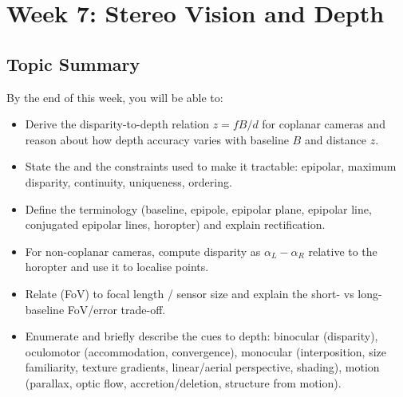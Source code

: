 \section{Week 7: Stereo Vision and Depth}

\subsection{Topic Summary}

\begin{keybox}
By the end of this week, you will be able to:
\begin{itemize}
  \item Derive the disparity-to-depth relation $z = fB/d$ for coplanar cameras and reason about how depth accuracy varies with baseline $B$ and distance $z$.
  \item State the  and the constraints used to make it tractable: epipolar, maximum disparity, continuity, uniqueness, ordering.
  \item Define the  terminology (baseline, epipole, epipolar plane, epipolar line, conjugated epipolar lines, horopter) and explain rectification.
  \item For non-coplanar cameras, compute disparity as $\alpha_L - \alpha_R$ relative to the horopter and use it to localise points.
  \item Relate  (FoV) to focal length / sensor size and explain the short- vs long-baseline FoV/error trade-off.
  \item Enumerate and briefly describe the cues to depth: binocular (disparity), oculomotor (accommodation, convergence), monocular (interposition, size familiarity, texture gradients, linear/aerial perspective, shading), motion (parallax, optic flow, accretion/deletion, structure from motion).
\end{itemize}
\end{keybox}

